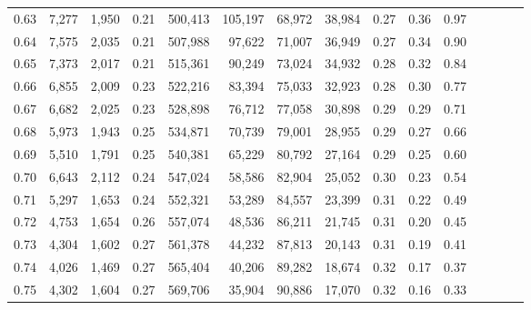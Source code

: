 \begin{tabular}{rrrcrrrrrrrrrrr}
0.63 &   7,277 &  1,950 &                                       0.21 &  500,413 &  105,197 &   68,972 &   38,984 &  0.27 &  0.36 &                         0.97 \\
0.64 &   7,575 &  2,035 &                                       0.21 &  507,988 &   97,622 &   71,007 &   36,949 &  0.27 &  0.34 &                         0.90 \\
0.65 &   7,373 &  2,017 &                                       0.21 &  515,361 &   90,249 &   73,024 &   34,932 &  0.28 &  0.32 &                         0.84 \\
0.66 &   6,855 &  2,009 &                                       0.23 &  522,216 &   83,394 &   75,033 &   32,923 &  0.28 &  0.30 &                         0.77 \\
0.67 &   6,682 &  2,025 &                                       0.23 &  528,898 &   76,712 &   77,058 &   30,898 &  0.29 &  0.29 &                         0.71 \\
0.68 &   5,973 &  1,943 &                                       0.25 &  534,871 &   70,739 &   79,001 &   28,955 &  0.29 &  0.27 &                         0.66 \\
0.69 &   5,510 &  1,791 &                                       0.25 &  540,381 &   65,229 &   80,792 &   27,164 &  0.29 &  0.25 &                         0.60 \\
0.70 &   6,643 &  2,112 &                                       0.24 &  547,024 &   58,586 &   82,904 &   25,052 &  0.30 &  0.23 &                         0.54 \\
0.71 &   5,297 &  1,653 &                                       0.24 &  552,321 &   53,289 &   84,557 &   23,399 &  0.31 &  0.22 &                         0.49 \\
0.72 &   4,753 &  1,654 &                                       0.26 &  557,074 &   48,536 &   86,211 &   21,745 &  0.31 &  0.20 &                         0.45 \\
0.73 &   4,304 &  1,602 &                                       0.27 &  561,378 &   44,232 &   87,813 &   20,143 &  0.31 &  0.19 &                         0.41 \\
0.74 &   4,026 &  1,469 &                                       0.27 &  565,404 &   40,206 &   89,282 &   18,674 &  0.32 &  0.17 &                         0.37 \\
0.75 &   4,302 &  1,604 &                                       0.27 &  569,706 &   35,904 &   90,886 &   17,070 &  0.32 &  0.16 &                         0.33 \\

\end{tabular}
